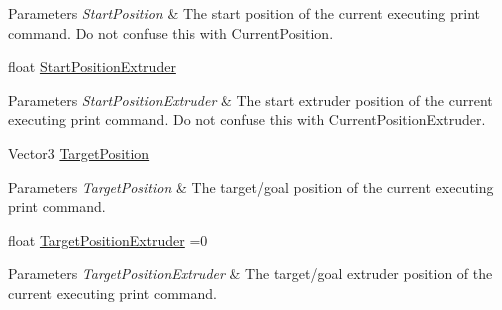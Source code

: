 \begin{DoxyCompactItemize}
\begin{DoxyCompactList}\small\item\em 
\begin{DoxyParams}{Parameters}
{\em Start\+Position} & The start position of the current executing print command. Do not confuse this with Current\+Position.\\
\hline
\end{DoxyParams}
\end{DoxyCompactList}\item 
\mbox{\label{class_printer_acfbb0acc8db7e9b93de243794f8fd48a}} 
float \hyperlink{class_printer_acfbb0acc8db7e9b93de243794f8fd48a}{Start\+Position\+Extruder}
\begin{DoxyCompactList}\small\item\em 
\begin{DoxyParams}{Parameters}
{\em Start\+Position\+Extruder} & The start extruder position of the current executing print command. Do not confuse this with Current\+Position\+Extruder.\\
\hline
\end{DoxyParams}
\end{DoxyCompactList}\item 
\mbox{\label{class_printer_aaa73fb90d38362a53216f0dbfc45a420}} 
Vector3 \hyperlink{class_printer_aaa73fb90d38362a53216f0dbfc45a420}{Target\+Position}
\begin{DoxyCompactList}\small\item\em 
\begin{DoxyParams}{Parameters}
{\em Target\+Position} & The target/goal position of the current executing print command.\\
\hline
\end{DoxyParams}
\end{DoxyCompactList}\item 
\mbox{\label{class_printer_ae18b84ef2a818e495204d228ab0ae831}} 
float \hyperlink{class_printer_ae18b84ef2a818e495204d228ab0ae831}{Target\+Position\+Extruder} =0
\begin{DoxyCompactList}\small\item\em 
\begin{DoxyParams}{Parameters}
{\em Target\+Position\+Extruder} & The target/goal extruder position of the current executing print command.\\
\hline
\end{DoxyParams}

\end{DoxyCompactList}
\end{DoxyCompactItemize}
